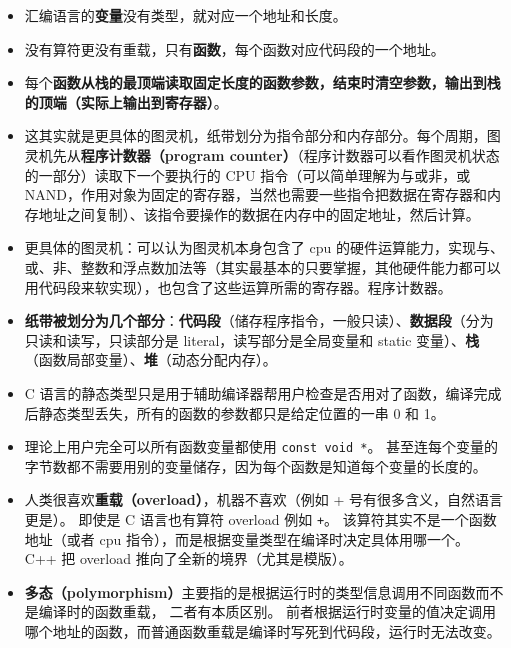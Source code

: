 \begin{itemize}
\item 汇编语言的\textbf{变量}没有类型，就对应一个地址和长度。
\item 没有算符更没有重载，只有\textbf{函数}，每个函数对应代码段的一个地址。
\item 每个\textbf{函数从栈的最顶端读取固定长度的函数参数，结束时清空参数，输出到栈的顶端（实际上输出到寄存器）}。
\item 这其实就是更具体的图灵机，纸带划分为指令部分和内存部分。每个周期，图灵机先从\textbf{程序计数器（program counter）}（程序计数器可以看作图灵机状态的一部分）读取下一个要执行的 CPU 指令（可以简单理解为与或非，或 NAND，作用对象为固定的寄存器，当然也需要一些指令把数据在寄存器和内存地址之间复制）、该指令要操作的数据在内存中的固定地址，然后计算。
\item 更具体的图灵机：可以认为图灵机本身包含了 cpu 的硬件运算能力，实现与、或、非、整数和浮点数加法等（其实最基本的只要掌握，其他硬件能力都可以用代码段来软实现），也包含了这些运算所需的寄存器。程序计数器。
\item \textbf{纸带被划分为几个部分}：\textbf{代码段}（储存程序指令，一般只读）、\textbf{数据段}（分为只读和读写，只读部分是 literal，读写部分是全局变量和 static 变量）、\textbf{栈}（函数局部变量）、\textbf{堆}（动态分配内存）。
\item C 语言的静态类型只是用于辅助编译器帮用户检查是否用对了函数，编译完成后静态类型丢失，所有的函数的参数都只是给定位置的一串 0 和 1。
\item 理论上用户完全可以所有函数变量都使用 \verb`const void *`。 甚至连每个变量的字节数都不需要用别的变量储存，因为每个函数是知道每个变量的长度的。
\item 人类很喜欢\textbf{重载（overload）}，机器不喜欢（例如 + 号有很多含义，自然语言更是）。 即使是 C 语言也有算符 overload 例如 \verb`+`。 该算符其实不是一个函数地址（或者 cpu 指令），而是根据变量类型在编译时决定具体用哪一个。 C++ 把 overload 推向了全新的境界（尤其是模版）。
\item \textbf{多态（polymorphism）}主要指的是根据运行时的类型信息调用不同函数而不是编译时的函数重载， 二者有本质区别。 前者根据运行时变量的值决定调用哪个地址的函数，而普通函数重载是编译时写死到代码段，运行时无法改变。
\end{itemize}
